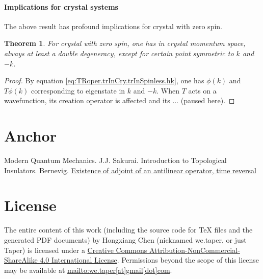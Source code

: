 \documentclass{article}
\numberwithin{equation}{subsection} %
\newtheorem{thm}{Theorem}[section]
\theoremstyle{definition}
\begin{document}
        \paragraph{Implications for crystal systems} The above result has
        profound implications for crystal with zero spin.
        \begin{thm}
            For crystal with zero spin, one has in crystal momentum space,
            always at least a double degeneracy, except for certain point
            symmetric to $k$ and $-k$.
        \end{thm}
        \begin{proof}
            By equation \ref{eq:TRoper.trInCry.trInSpinless.hk}, one has
            $\phi(k)$ and $T\phi(k)$ corresponding to eigenstate in
            $k$ and $-k$. When $T$ acts on a wavefunction, its
            creation operator is affected and its ... (paused here).
        \end{proof}
        
\section{Anchor}
\label{sec:Anchor}
\begin{thebibliography}{1}
     Modern Quantum Mechanics. J.J. Sakurai.
     Introduction to Topological Insulators. Bernevig.
    \href{http://physics.stackexchange.com/questions/45227/existence-of-adjoint-of-an-antilinear-operator-time-reversal}{Existence of adjoint of an antilinear operator, time reversal}
\end{thebibliography}
\printnomenclature
\section{License}
The entire content of this work (including the source code
for TeX files and the generated PDF documents) by 
Hongxiang Chen (nicknamed we.taper, or just Taper) is
licensed under a 
\href{http://creativecommons.org/licenses/by-nc-sa/4.0/}{Creative 
Commons Attribution-NonCommercial-ShareAlike 4.0 International 
License}. Permissions beyond the scope of this 
license may be available at \url{mailto:we.taper[at]gmail[dot]com}.
\end{document}
